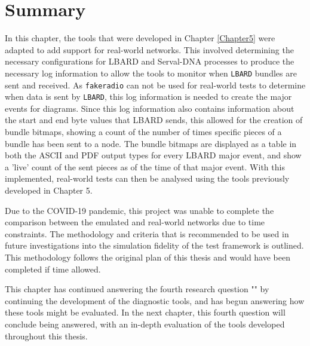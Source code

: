 \section{Summary}
In this chapter, the tools that were developed in Chapter \ref{Chapter5} were adapted to add support for real-world networks.
This involved determining the necessary configurations for LBARD and Serval-DNA processes to produce the necessary log information to allow the tools to monitor when \texttt{LBARD} bundles are sent and received.
As \texttt{fakeradio} can not be used for real-world tests to determine when data is sent by \texttt{LBARD}, this log information is needed to create the major events for diagrams.
Since this log information also contains information about the start and end byte values that LBARD sends, this allowed for the creation of bundle bitmaps, showing a count of the number of times specific pieces of a bundle has been sent to a node.
The bundle bitmaps are displayed as a table in both the ASCII and PDF output types for every LBARD major event, and show a 'live' count of the sent pieces as of the time of that major event.
With this implemented, real-world tests can then be analysed using the tools previously developed in Chapter 5.

Due to the COVID-19 pandemic, this project was unable to complete the comparison between the emulated and real-world networks due to time constraints. 
The methodology and criteria that is recommended to be used in future investigations into the simulation fidelity of the test framework is outlined. 
This methodology follows the original plan of this thesis and would have been completed if time allowed.

This chapter has continued answering the fourth research question "\fourthRQ" by continuing the development of the diagnostic tools, and has begun answering how these tools might be evaluated.
In the next chapter, this fourth question will conclude being answered, with an in-depth evaluation of the tools developed throughout this thesis.